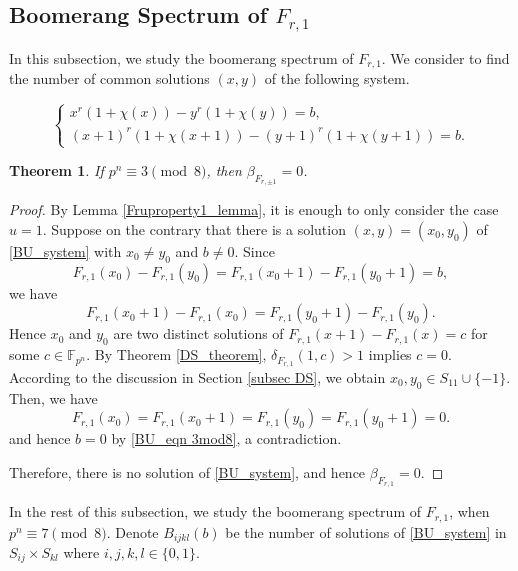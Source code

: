 \documentclass[11pt]{article}
\newtheorem{theorem}{Theorem}[section]
\numberwithin{theorem}{section}
\newcommand{\Fpn}{\mathbb{F}_{p^n}}
\begin{document}
\subsection{Boomerang Spectrum of $F_{r,1}$}\label{subsec BS}

In this subsection, we study the boomerang spectrum of $F_{r,1}$. We consider to find the number of common solutions $(x,y)$ of the following system.

\begin{equation}\label{BU_system}
	\begin{cases}
		x^r(1+\chi(x))-y^r(1+\chi(y))=b,\\
		(x+1)^r(1+\chi(x+1))-(y+1)^r(1+\chi(y+1))=b.
	\end{cases}
\end{equation}

\begin{theorem}\label{BU_thm 3mod8}
	If $p^n\equiv3\pmod{8}$, then $\beta_{F_{r,\pm1}}=0$. 
\end{theorem}
\begin{proof}
	By Lemma \ref{Fruproperty1_lemma}, it is enough to only consider the case $u=1$. Suppose on the contrary that there is a solution $(x,y)=(x_0,y_0)$ of \eqref{BU_system} with $x_0\ne y_0$ and $b\ne 0$. Since
	\begin{equation}\label{BU_eqn 3mod8}
		F_{r,1}(x_0)-F_{r,1}(y_0)=F_{r,1}(x_0+1)-F_{r,1}(y_0+1)=b,
	\end{equation} 
	we have 
	$$F_{r,1}(x_0+1)-F_{r,1}(x_0) = F_{r,1}(y_0+1)-F_{r,1}(y_0).$$
	Hence $x_0$ and $y_0$ are two distinct solutions of $F_{r,1}(x+1)-F_{r,1}(x)=c$ for some $c\in \Fpn$. By Theorem \ref{DS_theorem}, $\delta_{F_{r,1}} (1,c)>1$ implies $c=0$. According to the discussion in Section \ref{subsec DS}, we obtain $x_0, y_0 \in S_{11}\cup\{-1\}$. Then, we have $$F_{r,1}(x_0)=F_{r,1}(x_0+1)=F_{r,1}(y_0)=F_{r,1}(y_0+1)=0.$$
	and hence $b=0$ by \eqref{BU_eqn 3mod8}, a contradiction.
	
	Therefore, there is no solution of \eqref{BU_system}, and hence $\beta_{F_{r,1}}=0$. 
\end{proof}

\bigskip
In the rest of this subsection, we study the boomerang spectrum of $F_{r,1}$, when $p^n \equiv 7 \pmod{8}$. Denote $B_{ijkl}(b)$ be the number of solutions of \eqref{BU_system} in $S_{ij}\times S_{kl}$ where $i,j,k,l\in\{0,1\}$.
\end{document}
